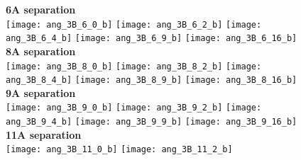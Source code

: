 \documentclass[journal=acsnano,manuscript=article]{achemso}
\begin{document}
	

\begin{figure}[h!]
	\centering
	\textbf{6A separation} \\
	\texttt{[image: ang\_3B\_6\_0\_b]} 
	\texttt{[image: ang\_3B\_6\_2\_b]}
	\texttt{[image: ang\_3B\_6\_4\_b]}
	\texttt{[image: ang\_3B\_6\_9\_b]}
	\texttt{[image: ang\_3B\_6\_16\_b]}
	\textbf{8A separation} \\
	\texttt{[image: ang\_3B\_8\_0\_b]} 
	\texttt{[image: ang\_3B\_8\_2\_b]}
	\texttt{[image: ang\_3B\_8\_4\_b]}
	\texttt{[image: ang\_3B\_8\_9\_b]}
	\texttt{[image: ang\_3B\_8\_16\_b]}
	\textbf{9A separation} \\
	\texttt{[image: ang\_3B\_9\_0\_b]} 
	\texttt{[image: ang\_3B\_9\_2\_b]}
	\texttt{[image: ang\_3B\_9\_4\_b]}
	\texttt{[image: ang\_3B\_9\_9\_b]}
	\texttt{[image: ang\_3B\_9\_16\_b]}
	\textbf{11A separation} \\
	\texttt{[image: ang\_3B\_11\_0\_b]} 
	\texttt{[image: ang\_3B\_11\_2\_b]}

\end{figure}
\end{document}
